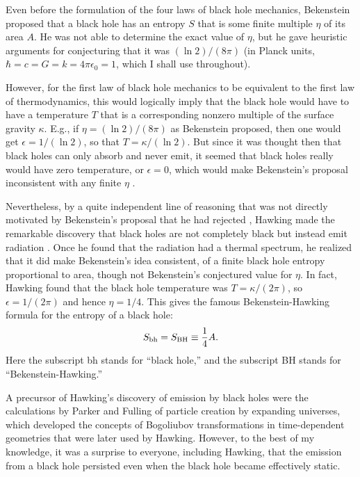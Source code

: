 \documentclass[12pt]{article} \usepackage{latexsym} \textwidth 15cm
\begin{document}
Even before the formulation of the four laws of black hole mechanics,
Bekenstein \cite{Bek1,Bek2,Bek3,Bek4} proposed that a black hole has
an entropy $S$ that is some finite multiple $\eta$ of its area $A$.
He was not able to determine the exact value of $\eta$, but he gave
heuristic arguments for conjecturing that it was $(\ln 2)/(8\pi)$ (in
Planck units, $\hbar = c = G = k = 4\pi\epsilon_0 = 1$, which I shall
use throughout).

However, for the first law of black hole mechanics to be equivalent to
the first law of thermodynamics, this would logically imply that the
black hole would have to have a temperature $T$ that is a
corresponding nonzero multiple of the surface gravity $\kappa$.  E.g.,
if $\eta = (\ln 2)/(8\pi)$ as Bekenstein proposed, then one would get
$\epsilon = 1/(\ln 2)$, so that $T = \kappa/(\ln 2)$.  But since it
was thought then that black holes can only absorb and never emit, it
seemed that black holes really would have zero temperature, or
$\epsilon = 0$, which would make Bekenstein's proposal inconsistent
with any finite $\eta$ \cite{BCH}.

Nevertheless, by a quite independent line of reasoning that was not
directly motivated by Bekenstein's proposal that he had rejected
\cite{BCH}, Hawking made the remarkable discovery that black holes are
not completely black but instead emit radiation \cite{Haw1,Haw2}.
Once he found that the radiation had a thermal spectrum, he realized
that it did make Bekenstein's idea consistent, of a finite black hole
entropy proportional to area, though not Bekenstein's conjectured
value for $\eta$.  In fact, Hawking found that the black hole
temperature was $T = \kappa/(2\pi)$, so $\epsilon = 1/(2\pi)$ and
hence $\eta = 1/4$.  This gives the famous Bekenstein-Hawking formula
for the entropy of a black hole:
 \begin{equation}
 S_{\mathrm{bh}} = S_{\mathrm{BH}} \equiv {1\over 4} A.
 \label{eq:2}
 \end{equation}
Here the subscript bh stands for ``black hole,'' and the subscript BH
stands for ``Bekenstein-Hawking.''

A precursor of Hawking's discovery of emission by black holes were the
calculations by Parker \cite{Par1,Par2,Par3,Par4} and Fulling
\cite{Full1,Full2} of particle creation by expanding universes, which
developed the concepts of Bogoliubov transformations \cite{Bog} in
time-dependent geometries that were later used by Hawking.  However, to
the best of my knowledge, it was a surprise to everyone, including
Hawking, that the emission from a black hole persisted even when the
black hole became effectively static.
\end{document}
